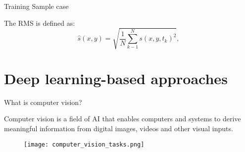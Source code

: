 \documentclass[10pt,aspectratio=169]{beamer} %
\begin{document}
\setcounter{subfigure}{0}
\begin{frame}{Training Sample case}
	\begin{figure}
		\centering
		\qquad
		\qquad
	\end{figure}

The RMS is defined as:
\begin{equation}
	\hat{s}(x,y) = \sqrt{\frac{1}{N}\sum_{k-1}^{N}s(x,y,t_k)^2}, 
	\label{eqn:rms} 
\end{equation}
\end{frame}
\section{Deep learning-based approaches}
\setcounter{subfigure}{0}
\begin{frame}{What is computer vision?}
	\begin{minipage}[c]{0.30\textwidth}
		Computer vision is a field of AI that enables computers and systems to derive meaningful information from digital images, videos and other visual inputs. 
	\end{minipage}
	\hfill
	\begin{minipage}[c]{0.65\textwidth}
		\begin{figure}
			\centering
			\texttt{[image: computer\_vision\_tasks.png]}
		\end{figure}
	\end{minipage}
\end{frame}
\end{document}
